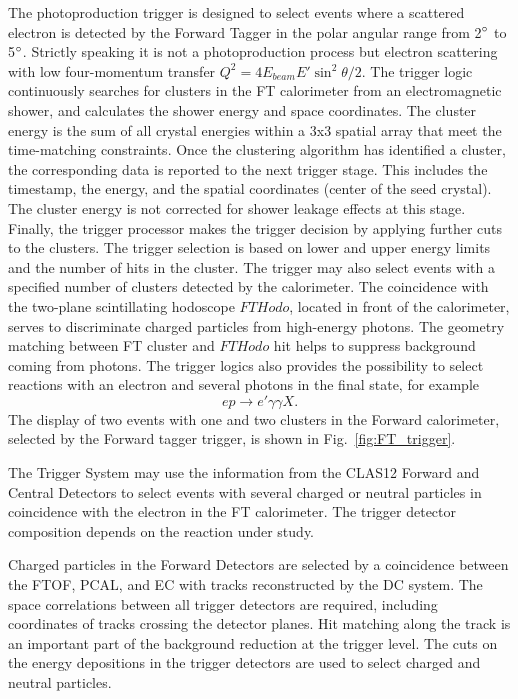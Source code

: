 The photoproduction trigger is designed to select events where a scattered electron is detected by the Forward Tagger in the polar angular range from 2$\degree$ to 5$\degree$. Strictly speaking it is not a photoproduction process but electron scattering with low four-momentum transfer $Q^2=4E_{beam}E'\sin^2\theta/2$. The trigger logic continuously searches for clusters in the FT calorimeter from an electromagnetic shower, and calculates the shower energy and space coordinates. The cluster energy is the sum of all  crystal energies within a 3x3 spatial array that meet the time-matching constraints. Once the clustering algorithm  has identified a cluster, the corresponding data is reported to the next trigger stage. This includes the timestamp, the energy, and the spatial coordinates (center of the seed crystal). The cluster energy is not corrected for shower leakage effects at this stage. Finally, the trigger processor makes the trigger decision by applying further cuts to the clusters. The trigger  selection is based on lower and upper energy limits and the number of hits in the cluster. The trigger may also select events with a specified number of clusters detected by the calorimeter.  The coincidence with the two-plane  scintillating hodoscope $FTHodo$,  located in front of the calorimeter, serves to discriminate charged particles from high-energy photons. The geometry matching between FT cluster and $FTHodo$ hit helps to suppress background coming from photons.  The trigger logics also provides  the possibility to select reactions with an electron and several photons in the final state, for example
$$
ep\to e'\gamma\gamma X.
$$
\noindent
The display of two events with  one and two clusters in the Forward calorimeter, selected by the Forward tagger trigger, is shown in Fig.~\ref{fig:FT_trigger}.

The Trigger System may use the  information from the CLAS12 Forward and Central Detectors to select events with several charged or neutral particles in coincidence with the electron in the FT calorimeter. The trigger detector composition depends on the reaction under study. 

Charged particles in the Forward Detectors are selected by a coincidence between the FTOF, PCAL, and EC with tracks reconstructed by the DC system. The space correlations between all trigger detectors are required, including coordinates of tracks crossing the detector planes. Hit matching along the track is an important part of the background reduction at the trigger level. The cuts on the energy depositions in the trigger detectors are used to select charged and neutral particles. 


